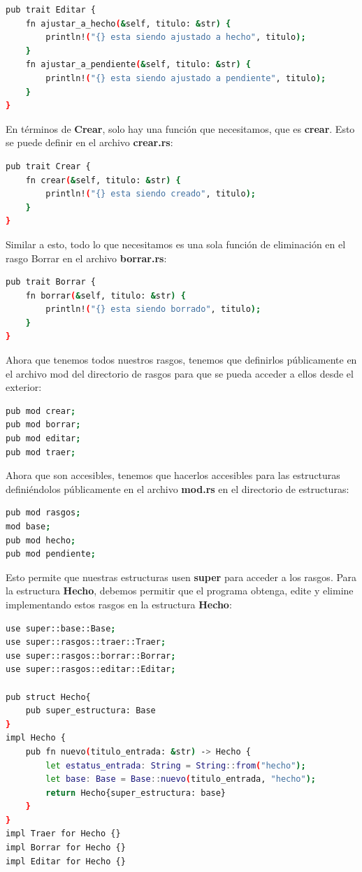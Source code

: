 \begin{lstlisting}[language=bash]
pub trait Editar {
	fn ajustar_a_hecho(&self, titulo: &str) {
		println!("{} esta siendo ajustado a hecho", titulo);
	}
	fn ajustar_a_pendiente(&self, titulo: &str) {
		println!("{} esta siendo ajustado a pendiente", titulo);
	}
}	
\end{lstlisting}


En términos de \textbf{Crear}, solo hay una función que necesitamos, que es \textbf{crear}. Esto se puede definir en el archivo \textbf{crear.rs}:

\begin{lstlisting}[language=bash]
pub trait Crear {
	fn crear(&self, titulo: &str) {
		println!("{} esta siendo creado", titulo);
	}
}
\end{lstlisting}

Similar a esto, todo lo que necesitamos es una sola función de eliminación en el rasgo Borrar en el archivo \textbf{borrar.rs}:

\begin{lstlisting}[language=bash]
pub trait Borrar {
	fn borrar(&self, titulo: &str) {
		println!("{} esta siendo borrado", titulo);
	}
}	
\end{lstlisting}

Ahora que tenemos todos nuestros rasgos, tenemos que definirlos públicamente en el archivo mod del directorio de rasgos para que se pueda acceder a ellos desde el exterior:

\begin{lstlisting}[language=bash]
pub mod crear;
pub mod borrar;
pub mod editar;
pub mod traer;
\end{lstlisting}

Ahora que son accesibles, tenemos que hacerlos accesibles para las estructuras definiéndolos públicamente en el archivo \textbf{mod.rs} en el directorio de estructuras:

\begin{lstlisting}[language=bash]
pub mod rasgos;
mod base;
pub mod hecho;
pub mod pendiente;
\end{lstlisting}


Esto permite que nuestras estructuras usen \textbf{super} para acceder a los rasgos. Para la estructura \textbf{Hecho}, debemos permitir que el programa obtenga, edite y elimine implementando estos rasgos en la estructura \textbf{Hecho}:

\begin{lstlisting}[language=bash]
use super::base::Base;
use super::rasgos::traer::Traer;
use super::rasgos::borrar::Borrar;
use super::rasgos::editar::Editar;

pub struct Hecho{
	pub super_estructura: Base
}
impl Hecho {
	pub fn nuevo(titulo_entrada: &str) -> Hecho {
		let estatus_entrada: String = String::from("hecho");
		let base: Base = Base::nuevo(titulo_entrada, "hecho");
		return Hecho{super_estructura: base}
	}
}
impl Traer for Hecho {}
impl Borrar for Hecho {}
impl Editar for Hecho {}
\end{lstlisting}

